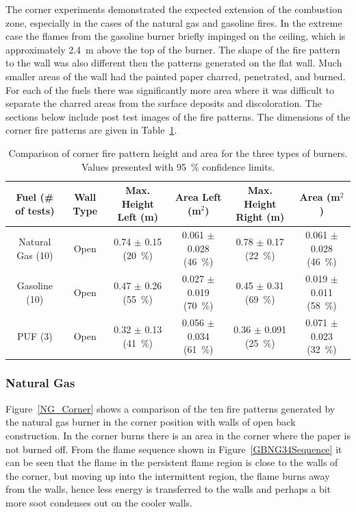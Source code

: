 \documentclass[twoside]{uocthesis}
\begin{document}
{The corner experiments demonstrated the expected extension of the combustion zone, especially in the cases of the natural gas and gasoline fires.  In the extreme case the flames from the gasoline burner briefly impinged on the ceiling, which is approximately 2.4~m above the top of the burner. The shape of the fire pattern to the wall was also different then the patterns generated on the flat wall.  Much smaller areas of the wall had the painted paper charred, penetrated, and burned.  For each of the fuels there was significantly more area where it was difficult to separate the charred areas from the surface deposits and discoloration. The sections below include post test images of the fire patterns.  The dimensions of the corner fire patterns are given in Table~\ref{tab:Fire_Pattern_Dimensions_Corners}.

\begin{table}
	\centering
	\footnotesize
	\begin{tabular}{|c|c|c|c|c|c|}
	\hline
	Fuel (\# of tests)      &   Wall Type   & Max. Height Left (m)	 	& Area Left (m$^2$)				&  Max. Height Right (m)        & Area (m$^2$)  				\\     \hline
		Natural Gas (10)    &   Open 		& 0.74 	$\pm$ 0.15 (20~\%)  & 0.061 $\pm$ 0.028 (46~\%) 	&  0.78 $\pm$ 0.17 (22~\%) 	 	& 0.061 $\pm$ 0.028 (46~\%)  	\\
		Gasoline (10)       &   Open    	& 0.47	$\pm$ 0.26 (55~\%)  & 0.027 $\pm$ 0.019 (70~\%) 	&  0.45 $\pm$ 0.31 (69~\%)  	& 0.019 $\pm$ 0.011 (58~\%)\\
		PUF (3)       		&   Open 		& 0.32	$\pm$ 0.13 (41~\%)  & 0.056 $\pm$ 0.034 (61~\%) 	&  0.36 $\pm$ 0.091 (25~\%)  	& 0.071 $\pm$ 0.023 (32~\%)\\
	\hline
	\end{tabular}
	\caption[Comparison of corner fire pattern height and area for the three types of burners]{Comparison of corner fire pattern height and area for the three types of burners. Values presented with 95~\% confidence limits.}
	\label{tab:Fire_Pattern_Dimensions_Corners}
\end{table}

\subsubsection{Natural Gas}

Figure~\ref{NG_Corner} shows a comparison of the ten fire patterns generated by the natural gas burner in the corner position with walls of open back construction. In the corner burns there is an area in the corner where the paper is not burned off.  From the flame sequence shown in Figure~\ref{GBNG34Sequence} it can be seen that the flame in the persistent flame region is close to the walls of the corner, but moving up into the intermittent region, the flame burns away from the walls, hence less energy is transferred to the walls and perhaps a bit more soot condenses out on the cooler walls.    

}
\end{document}
